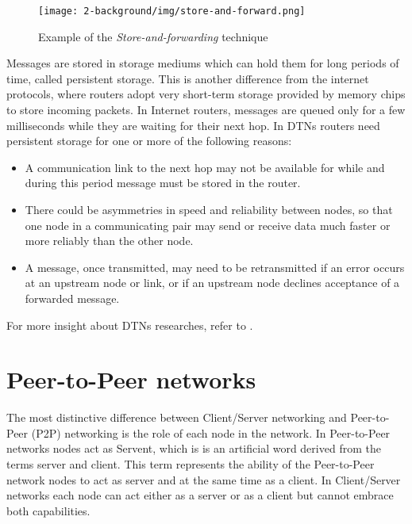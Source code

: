 \begin{figure}[htpb]
  \begin{center}
    \texttt{[image: 2-background/img/store-and-forward.png]}
    \caption{Example of the \textit{Store-and-forwarding} technique}    
    \label{fig:store-carry-forward}
  \end{center}
\end{figure}

Messages are stored in storage mediums which can hold them for long periods of time, called persistent storage. This is another difference from the internet protocols, where routers adopt very short-term storage provided by memory chips to store incoming packets. In Internet routers, messages are queued only for a few milliseconds while they are waiting for their next hop. In DTNs routers need persistent storage for one or more of the following reasons:
\begin{itemize}
\item A communication link to the next hop may not be available for while and during this period message must be stored in the router.
\item There could be asymmetries in speed and reliability between nodes, so that one node in a communicating pair may send or receive data much faster or more reliably than the other node.
\item A message, once transmitted, may need to be retransmitted if an error occurs at an upstream node or link, or if an upstream node declines acceptance of a forwarded message.
\end{itemize}

For more insight about DTNs researches, refer to \cite{dtnResearch}.

 
\section{Peer-to-Peer networks}
The most distinctive difference between Client/Server networking and Peer-to-Peer (P2P) networking is the role of each node in the network. In Peer-to-Peer networks nodes act as Servent, which is is an artificial word derived from the terms server and client. This term represents the ability of the Peer-to-Peer network nodes to act as server and at the same time as a client. In Client/Server networks each node can act either as a server or as a client but cannot embrace both capabilities.
\\

